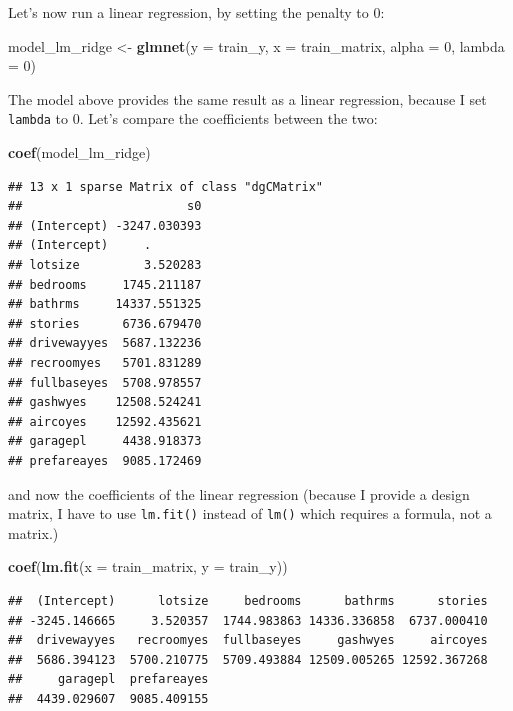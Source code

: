 \documentclass[]{gitbook}
\newenvironment{Shaded}{\begin{snugshade}}{\end{snugshade}}
\newcommand{\DataTypeTok}[1]{\textcolor[rgb]{0.13,0.29,0.53}{#1}}
\newcommand{\DecValTok}[1]{\textcolor[rgb]{0.00,0.00,0.81}{#1}}
\newcommand{\KeywordTok}[1]{\textcolor[rgb]{0.13,0.29,0.53}{\textbf{#1}}}
\newcommand{\NormalTok}[1]{#1}
\newcommand{\StringTok}[1]{\textcolor[rgb]{0.31,0.60,0.02}{#1}}
\theoremstyle{definition}
\theoremstyle{definition}
\theoremstyle{definition}
\theoremstyle{remark}
\begin{document}
Let's now run a linear regression, by setting the penalty to 0:

\begin{Shaded}
\begin{Highlighting}[]
\NormalTok{model_lm_ridge <-}\StringTok{ }\KeywordTok{glmnet}\NormalTok{(}\DataTypeTok{y =}\NormalTok{ train_y, }\DataTypeTok{x =}\NormalTok{ train_matrix, }\DataTypeTok{alpha =} \DecValTok{0}\NormalTok{, }\DataTypeTok{lambda =} \DecValTok{0}\NormalTok{)}
\end{Highlighting}
\end{Shaded}

The model above provides the same result as a linear regression, because
I set \texttt{lambda} to 0. Let's compare the coefficients between the
two:

\begin{Shaded}
\begin{Highlighting}[]
\KeywordTok{coef}\NormalTok{(model_lm_ridge)}
\end{Highlighting}
\end{Shaded}

\begin{verbatim}
## 13 x 1 sparse Matrix of class "dgCMatrix"
##                       s0
## (Intercept) -3247.030393
## (Intercept)     .       
## lotsize         3.520283
## bedrooms     1745.211187
## bathrms     14337.551325
## stories      6736.679470
## drivewayyes  5687.132236
## recroomyes   5701.831289
## fullbaseyes  5708.978557
## gashwyes    12508.524241
## aircoyes    12592.435621
## garagepl     4438.918373
## prefareayes  9085.172469
\end{verbatim}

and now the coefficients of the linear regression (because I provide a
design matrix, I have to use \texttt{lm.fit()} instead of \texttt{lm()}
which requires a formula, not a matrix.)

\begin{Shaded}
\begin{Highlighting}[]
\KeywordTok{coef}\NormalTok{(}\KeywordTok{lm.fit}\NormalTok{(}\DataTypeTok{x =}\NormalTok{ train_matrix, }\DataTypeTok{y =}\NormalTok{ train_y))}
\end{Highlighting}
\end{Shaded}

\begin{verbatim}
##  (Intercept)      lotsize     bedrooms      bathrms      stories 
## -3245.146665     3.520357  1744.983863 14336.336858  6737.000410 
##  drivewayyes   recroomyes  fullbaseyes     gashwyes     aircoyes 
##  5686.394123  5700.210775  5709.493884 12509.005265 12592.367268 
##     garagepl  prefareayes 
##  4439.029607  9085.409155
\end{verbatim}
\end{document}
